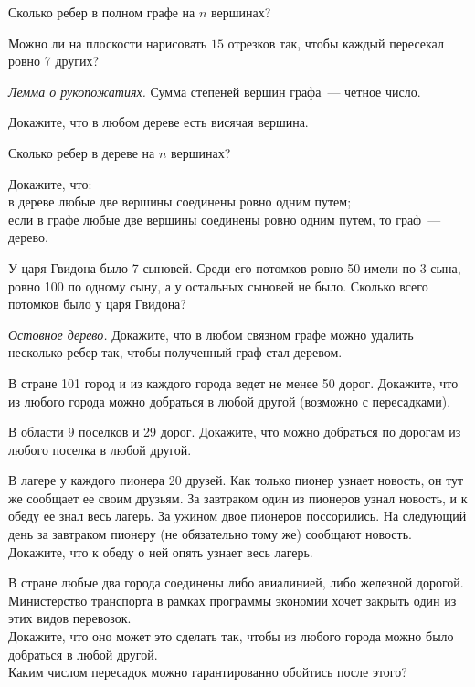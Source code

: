 \begin{problems}

\item
Сколько ребер в полном графе на $n$ вершинах?

\item
Можно ли на плоскости нарисовать $15$ отрезков так, чтобы каждый пересекал
ровно 7 других?

\item\emph{Лемма о рукопожатиях.}
Сумма степеней вершин графа~--- четное число.

\item
Докажите, что в любом дереве есть висячая вершина.

\item
Сколько ребер в дереве на $n$ вершинах?

\item
Докажите, что:
\\
\sbp
в дереве любые две вершины соединены ровно одним путем;
\\
\sbp
если в графе любые две вершины соединены ровно одним путем, то граф~--- дерево.

\item
У царя Гвидона было 7 сыновей.
Среди его потомков ровно 50 имели по 3 сына, ровно 100 по одному сыну, а у
остальных сыновей не было.
Сколько всего потомков было у царя Гвидона?

\item\emph{Остовное дерево.}
Докажите, что в любом связном графе можно удалить нес\-коль\-ко ребер так, чтобы
полученный граф стал деревом.

\item
В стране 101 город и из каждого города ведет не менее 50 дорог.
Докажите, что из любого города можно добраться в любой другой
(возможно с пересадками).

\item
В области 9 поселков и 29 дорог.
Докажите, что можно добраться по дорогам из любого поселка в любой другой.

\item
В лагере у каждого пионера 20 друзей.
Как только пионер узнает новость, он тут же сообщает ее своим друзьям.
За завтраком один из пионеров узнал новость, и к обеду ее знал весь лагерь.
За ужином двое пионеров поссорились.
На следующий день за завтраком пионеру (не обязательно тому же) сообщают
новость.
Докажите, что к обеду о ней опять узнает весь лагерь.

\item
В стране любые два города соединены либо авиалинией, либо железной дорогой.
Министерство транспорта в рамках программы экономии хочет закрыть один из этих
видов перевозок.
\\
\sbp
Докажите, что оно может это сделать так, чтобы из любого города можно было
добраться в любой другой.
\\
\sbp
Каким числом пересадок можно гарантированно обойтись после этого?

\end{problems}

